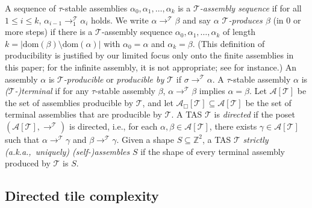 \documentclass{article}
\theoremstyle{remark}
\theoremstyle{definition}
\newcommand{\tas}{\ensuremath{\mathcal{T}}}
\newcommand{\dom}{\ensuremath{\mathrm{dom}}}
\begin{document}
A sequence of $\tau$-stable assemblies $\alpha_0, \alpha_1, \ldots, \alpha_k$ is a {\it $\tas$-assembly sequence} if for all $1 \le i \le k$, $\alpha_{i-1} \to_1^{\tas} \alpha_i$ holds. 
We write $\alpha \to^\tas \beta$ and say {\it $\alpha$ $\tas$-produces $\beta$} (in 0 or more steps) if there is a $\tas$-assembly sequence $\alpha_0, \alpha_1, \ldots, \alpha_k$ of length $k = |\dom(\beta) \setminus \dom(\alpha)|$ with $\alpha_0 = \alpha$ and $\alpha_k = \beta$. 
(This definition of producibility is justified by our limited focus only onto the finite assemblies in this paper; for the infinite assembly, it is not appropriate; see \cite{BrChDoKaSe2011} for instance.) 
An assembly $\alpha$ is {\it $\tas$-producible} or {\it producible by $\tas$} if $\sigma \to^\tas \alpha$. 
A $\tau$-stable assembly $\alpha$ is {\it ($\tas$-)terminal} if for any $\tau$-stable assembly $\beta$, $\alpha \to^\tas \beta$ implies $\alpha = \beta$. 
Let $\mathcal{A}[\tas]$ be the set of assemblies producible by $\tas$, and let $\mathcal{A}_\Box[\tas] \subseteq \mathcal{A}[\tas]$ be the set of terminal assemblies that are producible by $\tas$. 
A TAS $\tas$ is {\it directed} if the poset $(\mathcal{A}[\tas], \to^\tas)$ is directed, i.e., for each $\alpha, \beta \in \mathcal{A}[\tas]$, there exists $\gamma \in \mathcal{A}[\tas]$ such that $\alpha \to^\tas \gamma$ and $\beta \to^\tas \gamma$. 
Given a shape $S \subseteq \mathbb{Z}^2$, a TAS $\tas$ {\it strictly (a.k.a.,~uniquely) (self-)assembles} $S$ if the shape of every terminal assembly produced by $\tas$ is $S$. 

	\subsection{Directed tile complexity}
\end{document}
